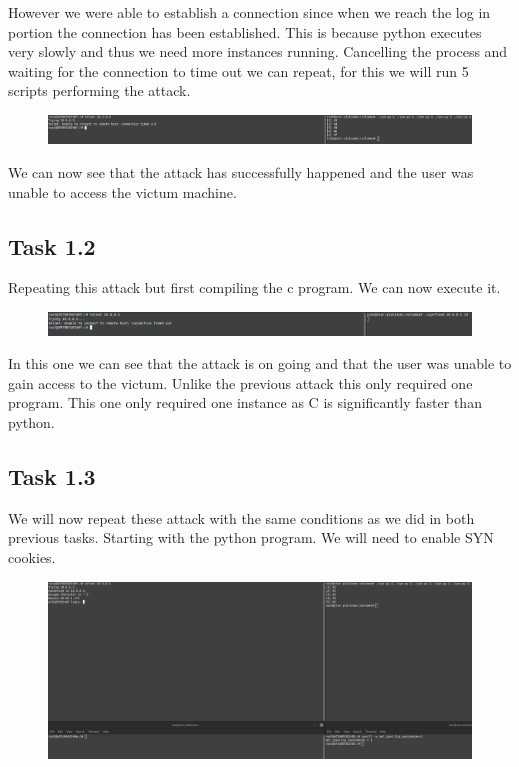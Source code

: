 \documentclass[12pt]{article}
\begin{document}
However we were able to establish a connection since when we reach the log in portion 
the connection has been established. This is because python executes very slowly and thus 
we need more instances running. Cancelling the process and waiting for the connection to time out 
we can repeat, for this we will run 5 scripts performing the attack.

\begin{figure}[!ht]
  \includegraphics*[scale=.25]{Task1.1Attempt2Attack.png}
\end{figure}

We can now see that the attack has successfully happened and the user was unable to access the victum machine.

\subsection*{Task 1.2}

Repeating this attack but first compiling the c program. We can now execute it.\\

\begin{figure}[!ht]
  \includegraphics*[scale=.3]{Task1.2Fail.png}
\end{figure}

In this one we can see that the attack is on going and that the user was unable to gain access to the victum. Unlike the previous 
attack this only required one program. This one only required one instance as C is significantly faster than python.


\subsection*{Task 1.3}

We will now repeat these attack with the same conditions as we did in both previous tasks. Starting with the 
python program. We will need to enable SYN cookies.\\

\begin{figure}[!ht]
  \includegraphics*[scale=.25]{1.3pythonCookies.png}
\end{figure}
\newpage
\end{document}
